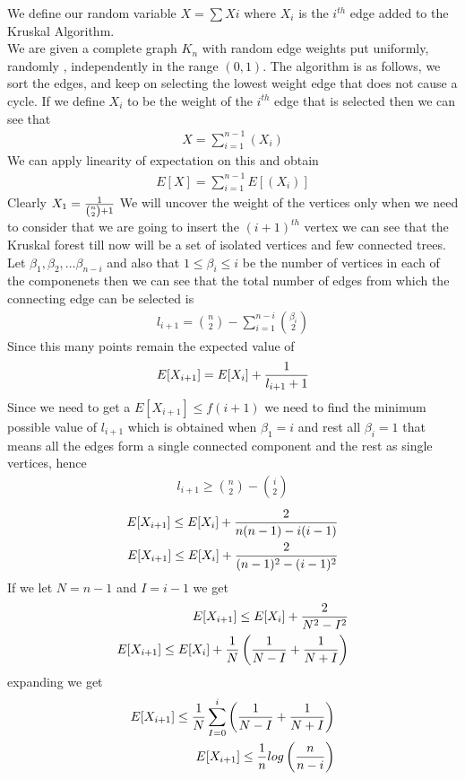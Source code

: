 \documentclass{assignment}
\begin{document}
\begin{problemlist}
\begin{problem}
\begin{answer}
We define our random variable $X=\sum Xi$ where $X_i$ is the $i^{th}$ edge added to the Kruskal Algorithm. \\
We are given a complete graph $K_n$ with random edge weights put uniformly, randomly , independently in the range $(0,1)$. The algorithm is as follows, we sort the edges, and keep on selecting the lowest weight edge that does not cause a cycle. 
If we define $X_i$ to be the weight of the $i^{th}$ edge that is selected then we can see that
\begin{eqnarray}
 X=\sum_{i=1}^{n-1} (X_i) 
\end{eqnarray}
 We can apply linearity of expectation on this and obtain
\begin{eqnarray}
 E[X]=\sum_{i=1}^{n-1} E[(X_i)] 
\end{eqnarray}
Clearly $X_1={1 \over \binom{n}{2} + 1}$
We will uncover the weight of the vertices only when we need to consider that we are going to insert the $(i+1)^{th}$ vertex we can see that the Kruskal forest till now will be a set of isolated vertices and few connected trees. Let $\beta_1, \beta_2, \ldots \beta_{n-i}$ and also that $1 \leq \beta_i \leq i$ be the number of vertices in each of the componenets then we can see that the total number of edges from which the connecting edge can be selected is 
\begin{eqnarray}
 l_{i+1} = \binom{n}{2} - \sum_{i=1}^{n-i} \binom{\beta_i}{2}  
\end{eqnarray}
Since this many points remain the expected value of 
\begin{eqnarray}
E[X_{i+1}] = E[X_i] + { 1 \over l_{i+1} +1 }   
\end{eqnarray}
Since we need to get a $E[X_{i+1}] \leq f(i+1) $ we need to find the minimum possible value of $l_{i+1}$ which is obtained when $\beta_1 = i$ and rest all $\beta_i=1$ that means all the edges form a single connected component and the rest as single vertices, hence 
\begin{eqnarray}
 l_{i+1} \geq \binom{n}{2} - \binom{i}{2}
\end{eqnarray}
\begin{eqnarray}
E[X_{i+1}] \leq  E[X_i] + { 2 \over n(n-1) - i(i-1)  }   \\
E[X_{i+1}] \leq  E[X_i] + { 2 \over (n-1)^2 - (i-1)^2}  
\end{eqnarray}
If we let $N=n-1$ and $I=i-1$ we get
\begin{eqnarray}
E[X_{i+1}] \leq  E[X_i] + { 2 \over N^2 - I^2}\\
 E[X_{i+1}] \leq E[X_i] + \frac{1}{N} \left( {  1 \over N - I } + {1 \over N+I} \right)
\end{eqnarray}
expanding we get 
\begin{eqnarray}
E[X_{i+1}] \leq \frac{1}{N} \sum_{I=0}^{i} \left( {  1 \over N - I } + {1 \over N+I} \right) \\
E[X_{i+1}] \leq \frac{1}{n} log \left( {n \over n-i} \right)
\end{eqnarray}


\end{answer}
\end{problem}
\end{problemlist}
\end{document}
